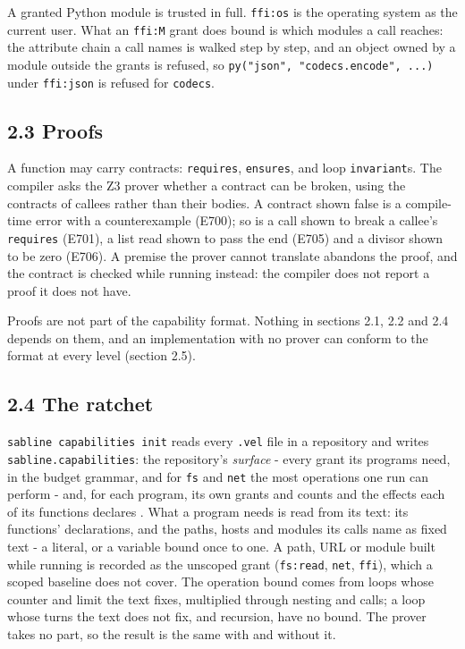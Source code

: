 \documentclass[
]{article}
\begin{document}
A granted Python module is trusted in full. \texttt{ffi:os} is the
operating system as the current user. What an \texttt{ffi:M} grant does
bound is which modules a call reaches: the attribute chain a call names
is walked step by step, and an object owned by a module outside the
grants is refused, so \texttt{py("json",\ "codecs.encode",\ ...)} under
\texttt{ffi:json} is refused for \texttt{codecs}.

\subsection{2.3 Proofs}\label{proofs}

A function may carry contracts: \texttt{requires}, \texttt{ensures}, and
loop \texttt{invariant}s. The compiler asks the Z3 prover
\citep{demoura2008z3} whether a contract can be broken, using the
contracts of callees rather than their bodies. A contract shown false is
a compile-time error with a counterexample (E700); so is a call shown to
break a callee's \texttt{requires} (E701), a list read shown to pass the
end (E705) and a divisor shown to be zero (E706). A premise the prover
cannot translate abandons the proof, and the contract is checked while
running instead: the compiler does not report a proof it does not have.

Proofs are not part of the capability format. Nothing in sections 2.1,
2.2 and 2.4 depends on them, and an implementation with no prover can
conform to the format at every level (section 2.5).

\subsection{2.4 The ratchet}\label{the-ratchet}

\texttt{sabline\ capabilities\ init} reads every \texttt{.vel} file in a
repository and writes \texttt{sabline.capabilities}: the repository's
\emph{surface} - every grant its programs need, in the budget grammar,
and for \texttt{fs} and \texttt{net} the most operations one run can
perform - and, for each program, its own grants and counts and the
effects each of its functions declares \citep[section 9]{sabline_spec}.
What a program needs is read from its text: its functions' declarations,
and the paths, hosts and modules its calls name as fixed text - a
literal, or a variable bound once to one. A path, URL or module built
while running is recorded as the unscoped grant (\texttt{fs:read},
\texttt{net}, \texttt{ffi}), which a scoped baseline does not cover. The
operation bound comes from loops whose counter and limit the text fixes,
multiplied through nesting and calls; a loop whose turns the text does
not fix, and recursion, have no bound. The prover takes no part, so the
result is the same with and without it.
\end{document}
